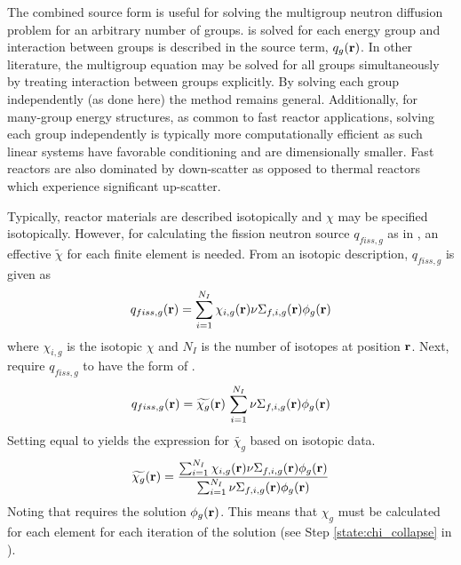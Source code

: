   The combined source form is useful for solving the
  multigroup neutron diffusion problem for an arbitrary number of groups.
  is solved for each energy group and interaction between groups is
  described in the source term, $q_g(\mathbf{r})$. In other literature, the multigroup
  equation may be solved for all groups simultaneously by treating interaction 
  between groups explicitly. By solving each group independently (as done here)
  the method remains general. Additionally, for many-group energy structures, as
  common to fast reactor applications, solving each group independently is 
  typically more computationally efficient as such linear systems have favorable 
  conditioning and are dimensionally smaller. Fast reactors are also dominated
  by down-scatter as opposed to thermal reactors which experience significant
  up-scatter.

  Typically, reactor materials are described isotopically and 
  $\chi$ may be specified isotopically. However, for calculating the fission 
  neutron source $q_{fiss,g}$ as in , an effective 
  $\widetilde{\chi}$ for each finite
  element is needed. From an isotopic description, $q_{fiss,g}$ is given as
  \begin{equation}
    \label{eq:isotopic_chi}
    q_{fiss,g}(\mathbf{r}) = \sum_{i=1}^{N_I} \chi_{i,g}(\mathbf{r})
      \nu \Sigma_{f,i,g}(\mathbf{r}) \phi_g(\mathbf{r})
  \end{equation}
  where $\chi_{i,g}$ is the isotopic $\chi$ and $N_I$ is the 
  number of isotopes at position $\mathbf{r}$. Next, require $q_{fiss,g}$ to have the 
  form of .
  \begin{equation}
    \label{eq:element_chi}
    q_{fiss,g}(\mathbf{r}) = \widetilde{\chi_g}(\mathbf{r}) \, 
      \sum_{i=1}^{N_I} \nu \Sigma_{f,i,g}(\mathbf{r}) \phi_g(\mathbf{r})
  \end{equation}
  Setting  equal to  yields the
  expression for $\widetilde{\chi_g}$ based on isotopic data.
  \begin{equation}
    \label{eq:chi_collapse}
    \widetilde{\chi_g}(\mathbf{r}) = \frac{\sum_{i=1}^{N_I} \chi_{i,g}(\mathbf{r})
      \nu \Sigma_{f,i,g}(\mathbf{r}) \phi_g(\mathbf{r})}
      {\sum_{i=1}^{N_I} \nu \Sigma_{f,i,g}(\mathbf{r}) \phi_g(\mathbf{r})}
  \end{equation}
  Noting that  requires the solution $\phi_g(\mathbf{r})$. This
  means that $\chi_g$ must be calculated for each element for each iteration of
  the solution (see Step \ref{state:chi_collapse} in
  ).

